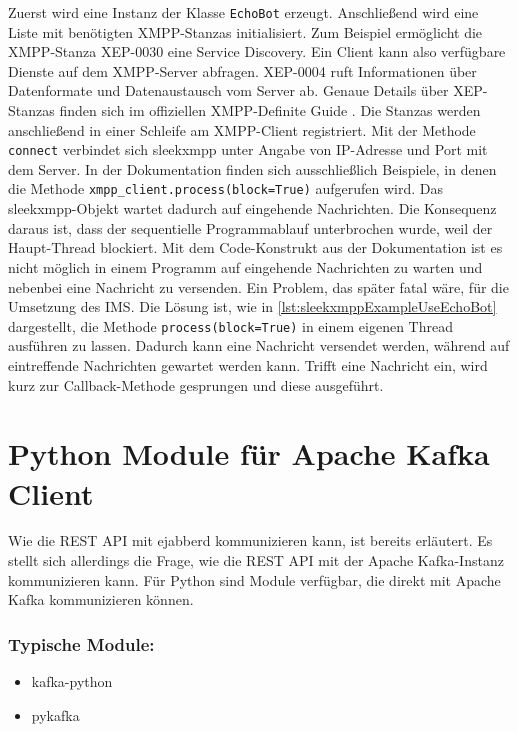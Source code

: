 \documentclass[a4paper,titlepage,halfparskip,12pt]{scrreprt}
\begin{document}
\begin{onehalfspacing}
Zuerst wird eine Instanz der Klasse \texttt{EchoBot} erzeugt. Anschließend wird eine Liste mit benötigten \acs{XMPP}-Stanzas initialisiert. Zum Beispiel ermöglicht die \acs{XMPP}-Stanza XEP-0030 eine Service Discovery. Ein Client kann also verfügbare Dienste auf dem \acs{XMPP}-Server abfragen. XEP-0004 ruft Informationen über Datenformate und Datenaustausch vom Server ab. Genaue Details über XEP-Stanzas finden sich im offiziellen \acs{XMPP}-Definite Guide \cite{definiteGuideXMPP}. Die Stanzas werden anschließend in einer Schleife am \acs{XMPP}-Client registriert. Mit der Methode \texttt{connect} verbindet sich sleekxmpp unter Angabe von IP-Adresse und Port mit dem Server.  In der Dokumentation finden sich ausschließlich Beispiele, in denen die Methode \texttt{xmpp\_client.process(block=True)} aufgerufen wird. Das sleekxmpp-Objekt wartet dadurch auf eingehende Nachrichten. Die Konsequenz daraus ist, dass der sequentielle Programmablauf unterbrochen wurde, weil der Haupt-Thread blockiert. Mit dem  Code-Konstrukt aus der Dokumentation ist es nicht möglich in einem Programm auf eingehende Nachrichten zu warten und nebenbei eine Nachricht zu versenden. Ein Problem, das später fatal wäre, für die Umsetzung des \acs{IMS}. Die Lösung ist, wie in \autoref{lst:sleekxmppExampleUseEchoBot} dargestellt, die Methode \texttt{process(block=True)} in einem eigenen Thread ausführen zu lassen. Dadurch kann eine Nachricht versendet werden, während auf eintreffende Nachrichten gewartet werden kann. Trifft eine Nachricht ein, wird kurz zur Callback-Methode gesprungen und diese ausgeführt.\cite{pythonSleekxmpp}

\section{Python Module für Apache Kafka Client}
\label{sec:KafkaModul}

Wie die \acs{REST} \acs{API} mit ejabberd kommunizieren kann, ist bereits erläutert. Es stellt sich allerdings die Frage, wie die \acs{REST} \acs{API} mit der Apache Kafka-Instanz kommunizieren kann. Für Python sind Module verfügbar, die direkt mit Apache Kafka kommunizieren können.

\subsubsection*{Typische Module:}

\begin{itemize}
\item kafka-python
\item pykafka
\end{itemize}


\end{onehalfspacing}
\end{document}

